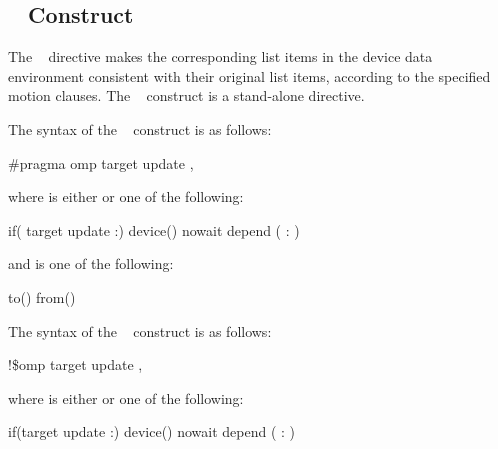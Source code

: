 {{{\vspace{-24pt}

\subsection{~ Construct}
\label{subsec:target update Construct}
\summary
The ~ directive makes the corresponding list items in the device data 
environment consistent with their original list items, according to the specified motion 
clauses. The ~ construct is a stand-alone directive.

\syntax
\ccppspecificstart
The syntax of the ~ construct is as follows:

\begin{boxedcode}
\#pragma omp target update \plc{clause[ [ [},\plc{] clause] ... ] new-line}
\end{boxedcode}
where  is either  or one of the following:

\begin{indentedcodelist}
if(\plc{[} target update :\plc{] scalar-expression})
device()
nowait
depend ( : )
\end{indentedcodelist}

and  is one of the following:

\begin{indentedcodelist}
to()
from()
\end{indentedcodelist}
\ccppspecificend

\fortranspecificstart
The syntax of the ~ construct is as follows:

\begin{boxedcode}
!\$omp target update \plc{clause[ [ [},\plc{] clause] ... ]}
\end{boxedcode}

where  is either  or one of the following:

\begin{indentedcodelist}
if(\plc{[}target update :\plc{] scalar-logical-expression})
device()
nowait
depend ( : )
\end{indentedcodelist}

}}}
